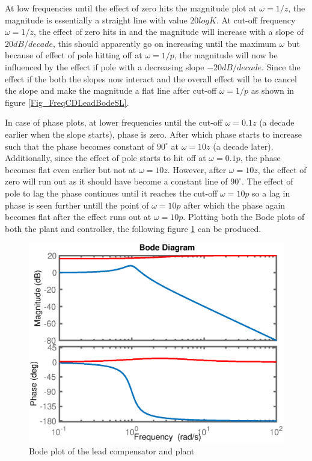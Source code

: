 At low frequencies until the effect of zero hits the magnitude plot at $\omega = 1/z$, the magnitude is essentially a straight line with value $20 log K$. At cut-off frequency $\omega = 1/z$, the effect of zero hits in and the magnitude will increase with a slope of $20 dB / decade$, this should apparently go on increasing until the maximum $\omega$ but because of effect of pole hitting off at $\omega = 1/p$, the magnitude will now be influenced by the effect if pole with a decreasing slope $-20 dB / decade$. Since the effect if the both the slopes now interact and the overall effect will be to cancel the slope and make the magnitude a flat line after cut-off $\omega = 1/p$ as shown in figure \ref{Fig_FreqCDLeadBodeSL}.

In case of phase plots, at lower frequencies until the cut-off $\omega = 0.1z$ (a decade earlier when the slope starts), phase is zero. After which phase starts to increase such that the phase becomes constant of $90^{\circ}$ at $\omega = 10z$ (a decade later). Additionally, since the effect of pole starts to hit off at $\omega = 0.1p$, the phase becomes flat even earlier but not at $\omega = 10z$. However, after $\omega = 10z$, the effect of zero will run out as it should have become a constant line of $90^{\circ}$. The effect of pole to lag the phase continues until it reaches the cut-off $\omega = 10p$ so a lag in phase is seen further untill the point of $\omega = 10p$ after which the phase again becomes flat after the effect runs out at $\omega = 10p$.
\newpage
Plotting both the Bode plots of both the plant and controller, the following figure \ref{Fig_FreqCDSysBodeSL} can be produced.
\begin{figure}[h!]
	\centering
	\includegraphics[width=0.8\linewidth]{Bilder/FreqCDSysBode.eps}
	\caption{Bode plot of the lead compensator and plant}
	\label{Fig_FreqCDSysBodeSL}
\end{figure}
